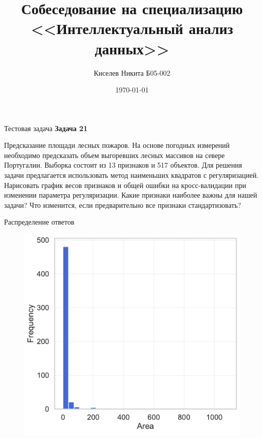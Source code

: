 \documentclass{beamer} %
\title{Собеседование на специализацию <<Интеллектуальный анализ данных>>}
\author{Киселев Никита Б05-002}
\date{\today}
\institute[Московский физико-технический институт]{Московский физико-технический институт \\ (национальный исследовательский университет)}
\begin{document}
	
	\begin{frame}
		\maketitle
	\end{frame}

	\begin{frame}{Тестовая задача}
        \textbf{Задача 21}

        Предсказание площади лесных пожаров. На основе погодных измерений необходимо 
        предсказать объем выгоревших лесных массивов на севере Португалии. Выборка 
        состоит из 13 признаков и 517 объектов. Для решения задачи предлагается 
        использовать метод наименьших квадратов с регуляризацией. Нарисовать график 
        весов признаков и общей ошибки на кросс-валидации при изменении параметра 
        регуляризации. Какие признаки наиболее важны для нашей задачи? Что изменится, 
        если предварительно все признаки стандартизовать?
    \end{frame}
	
    \begin{frame}{Распределение ответов}
        \begin{figure}[h!]
            \centering
            \includegraphics[scale = 0.5]{area_distribution.pdf}
        \end{figure}
    \end{frame}
\end{document}
